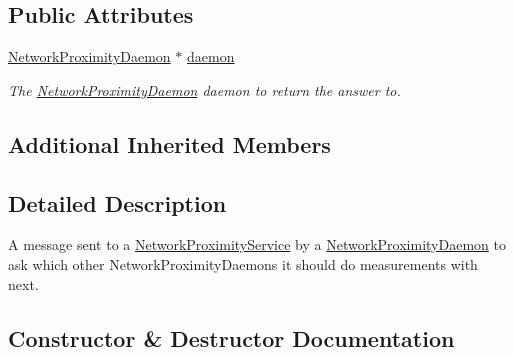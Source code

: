 \subsection*{Public Attributes}
\begin{DoxyCompactItemize}
\item 
\mbox{\label{classwrench_1_1_next_contact_daemon_request_message_ab6e503da009587d35cacb17a8cf03700}} 
\hyperlink{classwrench_1_1_network_proximity_daemon}{Network\+Proximity\+Daemon} $\ast$ \hyperlink{classwrench_1_1_next_contact_daemon_request_message_ab6e503da009587d35cacb17a8cf03700}{daemon}
\begin{DoxyCompactList}\small\item\em The \hyperlink{classwrench_1_1_network_proximity_daemon}{Network\+Proximity\+Daemon} daemon to return the answer to. \end{DoxyCompactList}\end{DoxyCompactItemize}
\subsection*{Additional Inherited Members}


\subsection{Detailed Description}
A message sent to a \hyperlink{classwrench_1_1_network_proximity_service}{Network\+Proximity\+Service} by a \hyperlink{classwrench_1_1_network_proximity_daemon}{Network\+Proximity\+Daemon} to ask which other Network\+Proximity\+Daemons it should do measurements with next. 

\subsection{Constructor \& Destructor Documentation}
\mbox{\label{classwrench_1_1_next_contact_daemon_request_message_ae99d16d68b286d0087d500e60787f14d}} 
